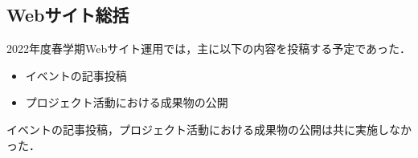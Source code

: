 \subsection*{Webサイト総括}


2022年度春学期Webサイト運用では，主に以下の内容を投稿する予定であった．

\begin{itemize}
\item イベントの記事投稿
\item プロジェクト活動における成果物の公開
\end{itemize}

イベントの記事投稿，プロジェクト活動における成果物の公開は共に実施しなかった．
